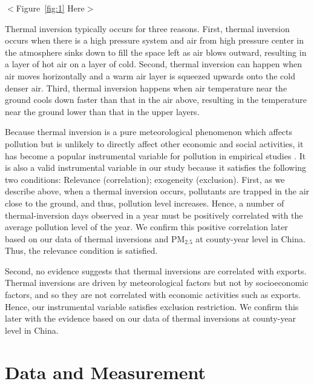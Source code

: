\documentclass[12pt]{article}
\begin{document}
\begin{center}
$<$Figure~\ref{fig:1} Here$>$ 
\end{center}

Thermal inversion typically occurs for three reasons. First, thermal inversion
occurs when there is a high pressure system and air from high pressure
center in the atmosphere sinks down to fill the space left as air blows
outward, resulting in a layer of hot air on a layer of cold. Second, thermal
inversion can happen when air moves horizontally and a warm air layer is
squeezed upwards onto the cold denser air. Third, thermal inversion
happens when air temperature near the ground cools down faster than that in
the air above, resulting in the temperature near the ground lower than that
in the upper layers. 

Because thermal inversion is a pure meteorological phenomenon which affects
pollution but is unlikely to directly affect other economic and social
activities, it has become a popular instrumental variable for pollution in
empirical studies %
\citep{arceo2016does,jans2018economic,sager2019estimating,chen2022effect,NBERw28401}%
. It is also a valid instrumental variable in our study because it satisfies
the following two conditions: Relevance (correlation); exogeneity (exclusion). First,
as we describe above, when a thermal inversion occurs, pollutants are
trapped in the air close to the ground, and thus, pollution level increases.
Hence, a number of thermal-inversion days observed in a year must be positively
correlated with the average pollution level of the year. We confirm this positive correlation later based on our data of thermal inversions and $\mathrm{PM_{2.5}}$ at county-year level in China. Thus, the relevance condition is satisfied.

  Second, no evidence suggests that thermal inversions are correlated with
  exports. Thermal inversions are driven by meteorological factors but not by
  socioeconomic factors, and so they are not correlated with economic activities
  such as exports. Hence, our instrumental variable satisfies exclusion restriction. We confirm this later with the evidence based on our data of
  thermal inversions at county-year level in China. 
  
  \section{Data and Measurement}

  \label{sec:3}
  
\end{document}
